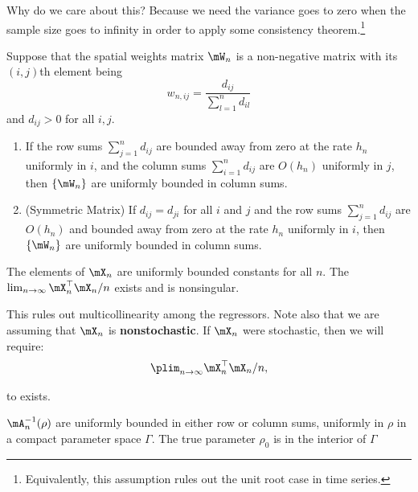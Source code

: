 \documentclass[english,12pt]{book}\usepackage[]{graphicx}\usepackage[]{xcolor}
\begin{document}
Why do we care about this? Because we need the variance goes to zero when the sample size goes to infinity in order to apply some consistency theorem.\footnote{Equivalently, this assumption rules out the unit root case in time series.}

\begin{lemma}
  Suppose that the spatial weights matrix $\mW_n$ is a non-negative matrix with its $(i,j)$th element being 
  \begin{equation*}
    w_{n,ij} = \frac{d_{ij}}{\sum_{l = 1}^nd_{il}}
  \end{equation*}
  and $d_{ij}>0$ for all $i,j$.
  
  \begin{enumerate}
    \item If the row sums $\sum_{j = 1}^nd_{ij}$ are bounded away from zero at the rate $h_n$ uniformly in $i$, and the column sums $\sum_{i = 1}^nd_{ij}$ are $O(h_n)$ uniformly in $j$, then $\left\lbrace \mW_n \right\rbrace$  are uniformly bounded in column sums.
    \item (Symmetric Matrix) If $d_{ij} = d_{ji}$ for all $i$ and $j$ and the row sums $\sum_{j = 1}^nd_{ij}$ are $O(h_n)$ and bounded away from zero at the rate $h_n$ uniformly in $i$, then $\left\lbrace \mW_n \right\rbrace$  are uniformly bounded in column sums.
  \end{enumerate}
\end{lemma}

\begin{assumption}\label{assu:ml_6}
	The elements of $\mX_n$ are uniformly bounded constants for all $n$. The $\lim_{n\to \infty}\mX_n^\top\mX_n/n$ exists and is nonsingular. 
\end{assumption}

This rules out multicollinearity among the regressors. Note also that we are assuming that $\mX_n$ is \textbf{nonstochastic}. If $\mX_n$ were stochastic, then we will require:
\begin{equation*}
  \plim_{n\to \infty}\mX_n^\top\mX_n/ n,
\end{equation*}

to exists.

\begin{assumption}\label{assu:ml_7}
	${\mA_n^{-1}(\rho)}$ are uniformly bounded in either row or column sums, uniformly in $\rho$ in a compact parameter space $\Gamma$. The true parameter $\rho_0$ is in the interior of $\Gamma$
\end{assumption}
\end{document}
